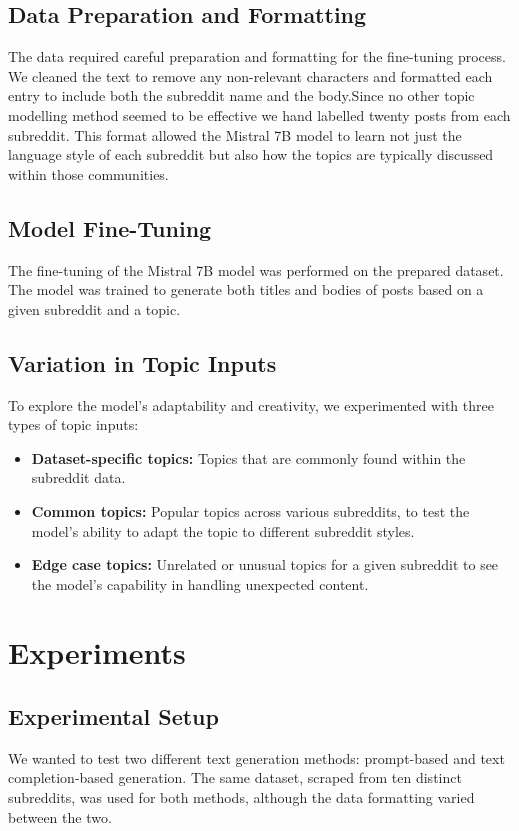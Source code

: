 \documentclass{article}
\begin{document}
\subsection{Data Preparation and Formatting}
The data required careful preparation and formatting for the fine-tuning process. We cleaned the text to remove any non-relevant characters and formatted each entry to include both the subreddit name and the body.Since no other topic modelling method seemed to be effective we hand labelled twenty posts from each subreddit. This format allowed the Mistral 7B model to learn not just the language style of each subreddit but also how the topics are typically discussed within those communities.

\subsection{Model Fine-Tuning}
The fine-tuning of the Mistral 7B model was performed on the prepared dataset. The model was trained to generate both titles and bodies of posts based on a given subreddit and a topic. 

\subsection{Variation in Topic Inputs}
To explore the model's adaptability and creativity, we experimented with three types of topic inputs:
\begin{itemize}
    \item \textbf{Dataset-specific topics:} Topics that are commonly found within the subreddit data.
    \item \textbf{Common topics:} Popular topics across various subreddits, to test the model's ability to adapt the topic to different subreddit styles.
    \item \textbf{Edge case topics:} Unrelated or unusual topics for a given subreddit to see the model's capability in handling unexpected content.
\end{itemize}

\section{Experiments}

\subsection{Experimental Setup}
We wanted to test two different text generation methods: prompt-based and text completion-based generation. The same dataset, scraped from ten distinct subreddits, was used for both methods, although the data formatting varied between the two.
\end{document}
